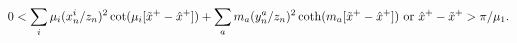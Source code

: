 \begin{equation}
\label{futineq5}
0 <
\sum_i \mu_i (x^i_n/z_n)^2 \cot(\mu_i  [\tilde x^+-\hat x^+]) + 
\sum_a m_a (y^a_n/z_n)^2 \coth(m_a  [\tilde x^+ -\hat x^+])
\ {\rm or} \ \hat x^+ - \tilde x^+ > \pi/\mu_1.  
\end{equation}


